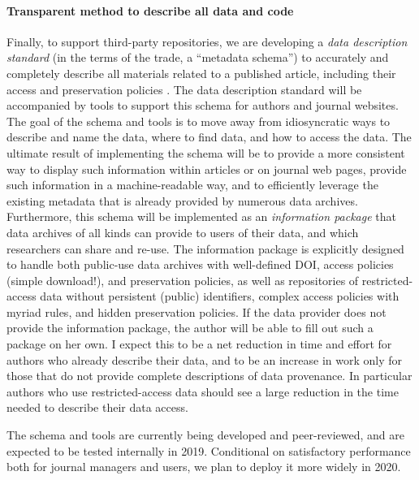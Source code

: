 \documentclass[PP]{AEA}
\begin{document}
\paragraph{Transparent method to describe all data and code} Finally, to  support  third-party repositories, we are developing a \textit{data description standard} (in the terms of the trade, a ``metadata schema'') to accurately and completely describe all materials related to a published article, including their access and preservation policies \citep{VilhuberZenodo2019}. The data description standard will be accompanied by  tools to support this schema for authors and journal websites.
The goal of the schema and tools is to move away from idiosyncratic ways to describe and name the data, where to find data, and how to access the data. The ultimate result of implementing the schema will be to provide a more consistent way to display such information within articles or on journal web pages, provide such information in a machine-readable way, and to efficiently leverage the existing metadata that is already provided by numerous data archives. Furthermore, this schema will be implemented as an \textit{information package} that data archives of all kinds can provide to users of their data, and which researchers can share and re-use. The information package is explicitly designed to handle both public-use data archives with well-defined \ac{DOI}, access policies (simple download!), and preservation policies, as well as repositories of restricted-access data without persistent (public) identifiers, complex access policies with myriad rules, and hidden preservation policies. If the data provider does not provide the information package, the author will be able to fill out such a package on her own. I expect this to be a net reduction in time and effort for authors who already describe their data, and to be an increase in work only for those that do not provide complete descriptions of data provenance. In particular authors who use restricted-access data should see a large reduction in the time needed to describe their data access. 

The schema and tools are currently being developed and peer-reviewed, and are expected to be tested  internally in 2019. Conditional on satisfactory performance both for journal managers and users, we plan to deploy it more widely in 2020. 
\end{document}
